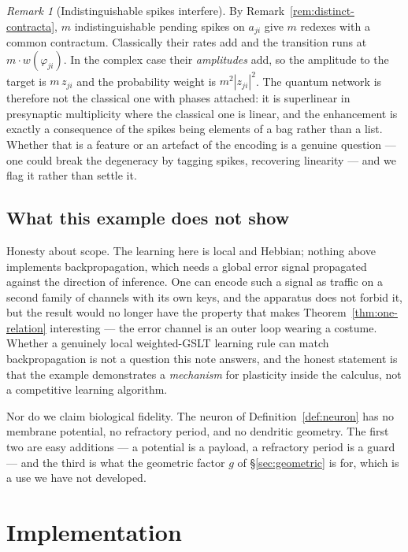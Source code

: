 \documentclass[11pt,a4paper]{article}
\theoremstyle{plain}
\theoremstyle{definition}
\theoremstyle{remark}
\newtheorem{remark}[theorem]{Remark}
\newcommand{\wmap}{w}
\newcommand{\gfac}{g}
\begin{document}
\begin{remark}[Indistinguishable spikes interfere]
\label{rem:bosonic}
By Remark~\ref{rem:distinct-contracta}, $m$ indistinguishable pending spikes on $a_{ji}$ give $m$
redexes with a common contractum. Classically their rates add and the transition runs at
$m \cdot \wmap(\varphi_{ji})$. In the complex case their \emph{amplitudes} add, so the amplitude to
the target is $m\,z_{ji}$ and the probability weight is $m^2 |z_{ji}|^2$. The quantum network is
therefore not the classical one with phases attached: it is superlinear in presynaptic multiplicity
where the classical one is linear, and the enhancement is exactly a consequence of the spikes being
elements of a bag rather than a list. Whether that is a feature or an artefact of the encoding is a
genuine question --- one could break the degeneracy by tagging spikes, recovering linearity --- and
we flag it rather than settle it.
\end{remark}

\subsection{What this example does not show}

Honesty about scope. The learning here is local and Hebbian; nothing above implements
backpropagation, which needs a global error signal propagated against the direction of inference.
One can encode such a signal as traffic on a second family of channels with its own keys, and the
apparatus does not forbid it, but the result would no longer have the property that makes
Theorem~\ref{thm:one-relation} interesting --- the error channel is an outer loop wearing a costume.
Whether a genuinely local weighted-GSLT learning rule can match backpropagation is not a question
this note answers, and the honest statement is that the example demonstrates a \emph{mechanism} for
plasticity inside the calculus, not a competitive learning algorithm.

Nor do we claim biological fidelity. The neuron of Definition~\ref{def:neuron} has no membrane
potential, no refractory period, and no dendritic geometry. The first two are easy additions --- a
potential is a payload, a refractory period is a guard --- and the third is what the geometric factor
$\gfac$ of \S\ref{sec:geometric} is for, which is a use we have not developed.

\section{Implementation}
\label{sec:impl}
\end{document}
